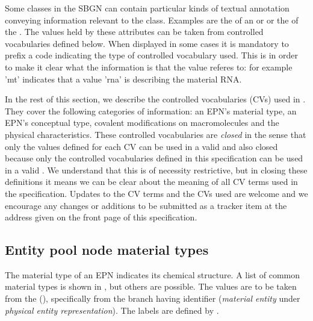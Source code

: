 
Some classes in the SBGN \PDl can contain particular kinds of textual
annotation conveying information relevant to the class.  Examples are
the  of an  or
 or the  of the
. The values held by these attributes can be
taken from controlled vocabularies defined below. When displayed in
some cases it is mandatory to prefix a code indicating the type of
controlled vocabulary used.  This is in order to make it clear what
the information is that the value referes to: for example 'mt'
indicates that a value 'rna' is describing the material RNA.

In the rest of this section, we describe the controlled vocabularies
(CVs) used in \SBGNPDLone.  They cover the following categories of
information: an EPN's material type, an EPN's conceptual type,
covalent modifications on macromolecules and the physical
characteristics. These controlled vocabularies are \emph{closed} in
the sense that only the values defined for each CV can be used in a
valid \PDm and also closed because only the controlled vocabularies
defined in this specification can be used in a valid \PDm{}. We
understand that this is of necessity restrictive, but in closing these
definitions it means we can be clear about the meaning of all CV terms
used in the specification. Updates to the CV terms and the CVs used
are welcome and we encourage any changes or additions to be submitted
as a tracker item at the address given on the front page of this
specification.


\subsection{Entity pool node material types}
\label{sec:techref:material-types-cv}

The material type of an EPN indicates its chemical structure.  A list
of common material types is shown in , but
others are possible.  The values are to be taken from the \sbo
(\sbourl), specifically from the branch having identifier
 ($\!$\emph{material entity} under \emph{physical entity representation}).
The labels are defined by \SBGNPDLone.

